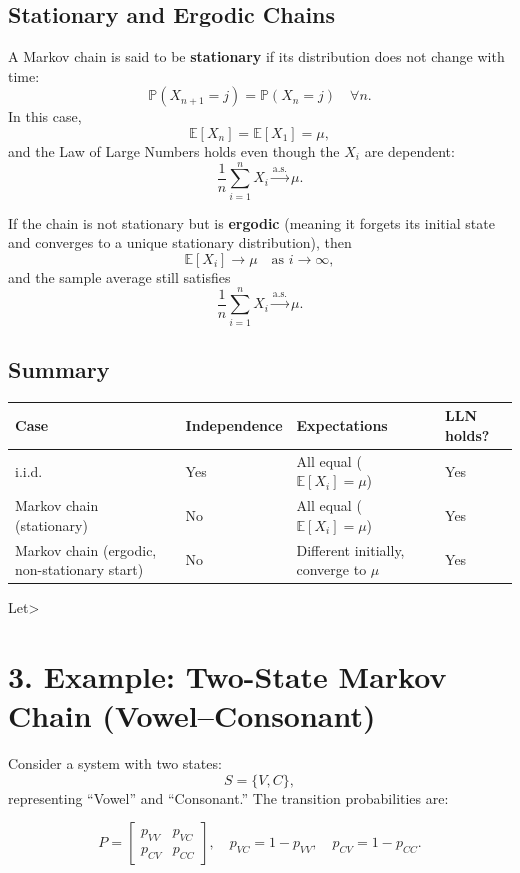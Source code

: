 \subsection*{Stationary and Ergodic Chains}

A Markov chain is said to be \textbf{stationary} if its distribution does not
change with time:
\[
\mathbb{P}(X_{n+1} = j) = \mathbb{P}(X_n = j) \quad \forall n.
\]
In this case,
\[
\mathbb{E}[X_n] = \mathbb{E}[X_1] = \mu,
\]
and the Law of Large Numbers holds even though the $X_i$ are dependent:
\[
\frac{1}{n} \sum_{i=1}^{n} X_i \xrightarrow{\text{a.s.}} \mu.
\]

If the chain is not stationary but is \textbf{ergodic} (meaning it forgets its
initial state and converges to a unique stationary distribution), then
\[
\mathbb{E}[X_i] \to \mu \quad \text{as } i \to \infty,
\]
and the sample average still satisfies
\[
\frac{1}{n} \sum_{i=1}^{n} X_i \xrightarrow{\text{a.s.}} \mu.
\]

\subsection*{Summary}

\begin{center}
\begin{tabular}{@{}llll@{}}
\toprule
\textbf{Case} & \textbf{Independence} & \textbf{Expectations} & \textbf{LLN holds?} \\
\midrule
i.i.d. & Yes & All equal ($\mathbb{E}[X_i] = \mu$) & Yes \\
Markov chain (stationary) & No & All equal ($\mathbb{E}[X_i] = \mu$) & Yes \\
Markov chain (ergodic, non-stationary start) & No & Different initially, converge to $\mu$ & Yes \\
\bottomrule
\end{tabular}
\end{center}




Let>
\section*{3. Example: Two-State Markov Chain (Vowel--Consonant)}

Consider a system with two states:
\[
S = \{ V, C \},
\]
representing ``Vowel'' and ``Consonant.''  
The transition probabilities are:

\[
P =
\begin{bmatrix}
p_{VV} & p_{VC} \\
p_{CV} & p_{CC}
\end{bmatrix},
\quad
p_{VC} = 1 - p_{VV}, \quad
p_{CV} = 1 - p_{CC}.
\]

